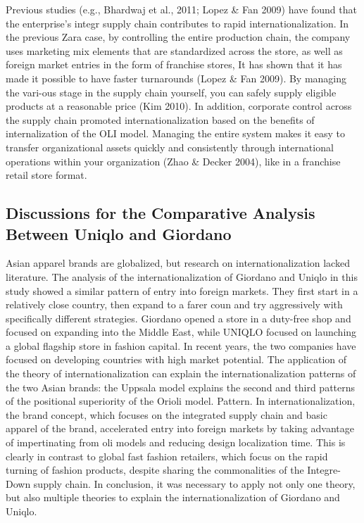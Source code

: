 \documentclass[]{article}
\begin{document}
Previous studies (e.g., Bhardwaj et al., 2011; Lopez \& Fan 2009) have
found that the enterprise's integr supply chain contributes to rapid
internationalization. In the previous Zara case, by controlling the
entire production chain, the company uses marketing mix elements that
are standardized across the store, as well as foreign market entries in
the form of franchise stores, It has shown that it has made it possible
to have faster turnarounds (Lopez \& Fan 2009). By managing the vari-ous
stage in the supply chain yourself, you can safely supply eligible
products at a reasonable price (Kim 2010). In addition, corporate
control across the supply chain promoted internationalization based on
the benefits of internalization of the OLI model. Managing the entire
system makes it easy to transfer organizational assets quickly and
consistently through international operations within your organization
(Zhao \& Decker 2004), like in a franchise retail store format.

\hypertarget{discussions-for-the-comparative-analysis-between-uniqlo-and-giordano}{%
\subsection{Discussions for the Comparative Analysis Between Uniqlo and
Giordano}\label{discussions-for-the-comparative-analysis-between-uniqlo-and-giordano}}

Asian apparel brands are globalized, but research on
internationalization lacked literature. The analysis of the
internationalization of Giordano and Uniqlo in this study showed a
similar pattern of entry into foreign markets. They first start in a
relatively close country, then expand to a farer coun and try
aggressively with specifically different strategies. Giordano opened a
store in a duty-free shop and focused on expanding into the Middle East,
while UNIQLO focused on launching a global flagship store in fashion
capital. In recent years, the two companies have focused on developing
countries with high market potential. The application of the theory of
internationalization can explain the internationalization patterns of
the two Asian brands: the Uppsala model explains the second and third
patterns of the positional superiority of the Orioli model. Pattern. In
internationalization, the brand concept, which focuses on the integrated
supply chain and basic apparel of the brand, accelerated entry into
foreign markets by taking advantage of impertinating from oli models and
reducing design localization time. This is clearly in contrast to global
fast fashion retailers, which focus on the rapid turning of fashion
products, despite sharing the commonalities of the Integre-Down supply
chain. In conclusion, it was necessary to apply not only one theory, but
also multiple theories to explain the internationalization of Giordano
and Uniqlo.
\end{document}
